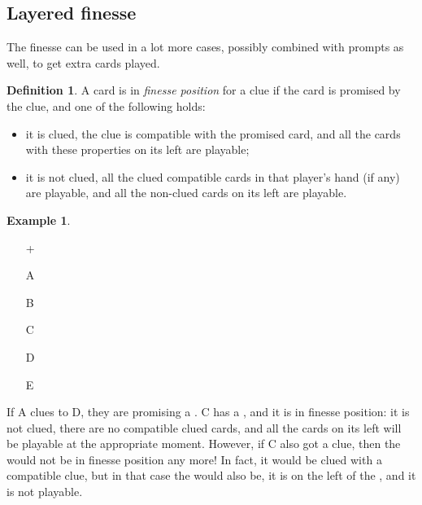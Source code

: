\documentclass[a4paper]{article}
\theoremstyle{plain}
\theoremstyle{definition}
\newtheorem{definition}[theorem]{Definition}
\newtheorem{example}[theorem]{Example}
\begin{document}
\subsection{Layered finesse}

The finesse can be used in a lot more cases, possibly combined with prompts as well, to get extra cards played.

\begin{definition}
	\label{def:finesse-position}
	A card is in \emph{finesse position} for a clue if the card is promised by the clue, and one of the following holds:
	
	\begin{itemize}
		\item it is clued, the clue is compatible with the promised card, and all the cards with these properties on its left are playable;
		\item it is not clued, all the clued compatible cards in that player's hand (if any) are playable, and all the non-clued cards on its left are playable.
	\end{itemize}
\end{definition}

\begin{example} \hfill \\
	\begin{minipage}{0.45\textwidth}
		\begin{itemize}
			\item[\Large +]      
			\item[\Large A]    
			\item[\Large B]    
			\item[\Large C]    
			\item[\Large D]    
			\item[\Large E]    
		\end{itemize}
	\end{minipage}%
	\begin{minipage}{0.55\textwidth}
		If A clues  to D, they are promising a . C has a , and it is in finesse position: it is not clued, there are no compatible clued cards, and all the cards on its left will be playable at the appropriate moment. However, if C also got a  clue, then the  would not be in finesse position any more! In fact, it would be clued with a compatible clue, but in that case the  would also be, it is on the left of the , and it is not playable.
	\end{minipage}
\end{example} \vspace{0.15 cm}
\end{document}
